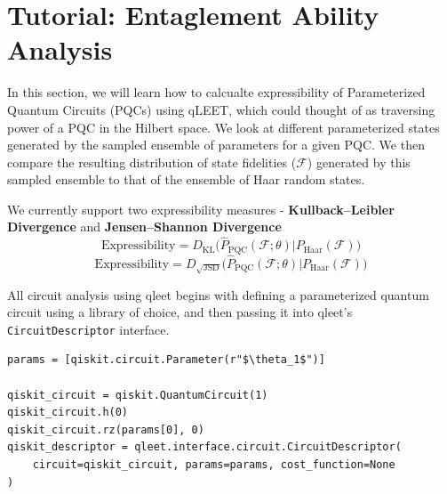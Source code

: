 

\section{\label{sec:supl-expressibility-tutorial}Tutorial: Entaglement Ability Analysis}

In this section, we will learn how to calcualte expressibility of Parameterized Quantum Circuits (PQCs) using qLEET, which could thought of as traversing power of a PQC in the Hilbert space. We look at different parameterized states generated by the sampled ensemble of parameters for a given PQC. We then compare the resulting distribution of state fidelities ($\mathcal{F}$) generated by this sampled ensemble to that of the ensemble of Haar random states.

We currently support two expressibility measures - \textbf{Kullback–Leibler Divergence} and \textbf{Jensen–Shannon Divergence}
$$ \textrm{Expressibility} = D_{\textrm{KL}} \Big( \hat{P}_{\textrm{PQC}}(\mathcal{F}; \theta) \big\vert P_{\textrm{Haar}}(\mathcal{F}) \Big) $$
$$ \textrm{Expressibility} = D_{\sqrt{\textrm{JSD}}} \Big( \hat{P}_{\textrm{PQC}}(\mathcal{F}; \theta) \big\vert P_{\textrm{Haar}}(\mathcal{F}) \Big) $$

All circuit analysis using qleet begins with defining a parameterized quantum circuit using a library of choice, and then passing it into qleet's \lstinline{CircuitDescriptor} interface.

\begin{lstlisting}
params = [qiskit.circuit.Parameter(r"$\theta_1$")]

qiskit_circuit = qiskit.QuantumCircuit(1)
qiskit_circuit.h(0)
qiskit_circuit.rz(params[0], 0)
qiskit_descriptor = qleet.interface.circuit.CircuitDescriptor(
    circuit=qiskit_circuit, params=params, cost_function=None
)
\end{lstlisting}


